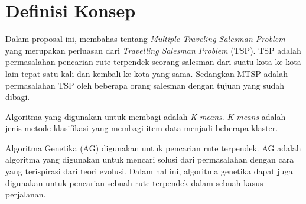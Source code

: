 \section{Definisi Konsep}

Dalam proposal ini, membahas tentang \textit{Multiple Traveling Salesman Problem} yang merupakan perluasan dari \textit{Travelling Salesman Problem} (TSP). TSP adalah permasalahan pencarian rute terpendek seorang salesman dari suatu kota ke kota lain tepat satu kali dan kembali ke kota yang sama. Sedangkan MTSP adalah permasalahan TSP oleh beberapa orang salesman dengan tujuan yang sudah dibagi.

Algoritma yang digunakan untuk membagi adalah \textit{K-means}. \textit{K-means} adalah jenis metode klasifikasi yang membagi item data menjadi beberapa klaster.

Algoritma Genetika (AG) digunakan untuk pencarian rute terpendek. AG adalah algoritma yang digunakan untuk mencari solusi dari permasalahan dengan cara yang terispirasi dari teori evolusi. Dalam hal ini, algoritma genetika dapat juga digunakan untuk pencarian sebuah rute terpendek dalam sebuah kasus perjalanan.
